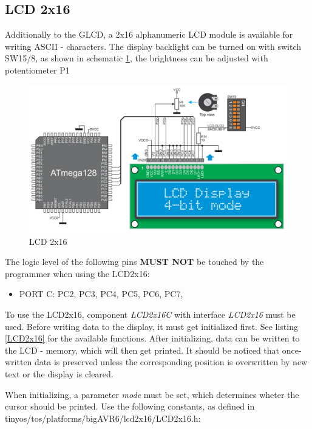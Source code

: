 \newpage

\subsection{LCD 2x16}

Additionally to the GLCD, a 2x16 alphanumeric LCD module is available for writing ASCII - characters. The display backlight can be turned on with switch SW15/8, as shown in schematic \ref{fig:lcd2x16}, the brightness can be adjusted with potentiometer P1

\begin{figure}[h]
 \centerline{\includegraphics[width=1.0\columnwidth]{pics/lcd2x16.png}}
  \caption{LCD 2x16}
  \label{fig:lcd2x16}
\end{figure}

The logic level of the following pins \textbf{MUST NOT} be touched by the programmer when using the LCD2x16:

\begin{itemize}
 \item PORT C: PC2, PC3, PC4, PC5, PC6, PC7, 
\end{itemize}

To use the LCD2x16, component \textit{LCD2x16C} with interface \textit{LCD2x16} must be used. Before writing data to the display, it must get initialized first. See listing \ref{LCD2x16} for the available functions. After initializing, data can be written to the LCD - memory, which will then get printed. It should be noticed that once-written data is preserved unless the corresponding position is overwritten by new text or the display is cleared. 

When initializing, a parameter \textit{mode} must be set, which determines wheter the cursor should be printed. Use the following constants, as defined in tinyos/tos/platforms/bigAVR6/lcd2x16/LCD2x16.h:

